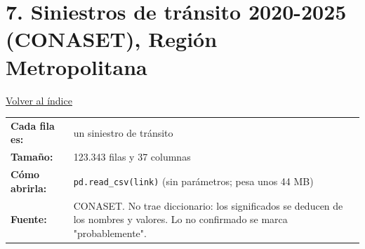 \documentclass[10.5pt]{article}
\begin{document}
\section*{7. Siniestros de tránsito 2020-2025 (CONASET), Región Metropolitana}
\vspace{-6pt}\hfill{\small\hyperlink{indice}{\textcolor{azuloscuro}{\underline{Volver al índice}}}}\par\vspace{2pt}
\begin{tabularx}{\linewidth}{@{}l X@{}}\textbf{Cada fila es:} & un siniestro de tránsito \\\textbf{Tamaño:} & 123.343 filas y 37 columnas \\\textbf{Cómo abrirla:} & \texttt{pd.read\_\allowbreak{}csv(link)} (sin parámetros; pesa unos 44 MB) \\\textbf{Fuente:} & CONASET. No trae diccionario: los significados se deducen de los nombres y valores. Lo no confirmado se marca "probablemente". \\\end{tabularx}
\vspace{6pt}
\end{document}
